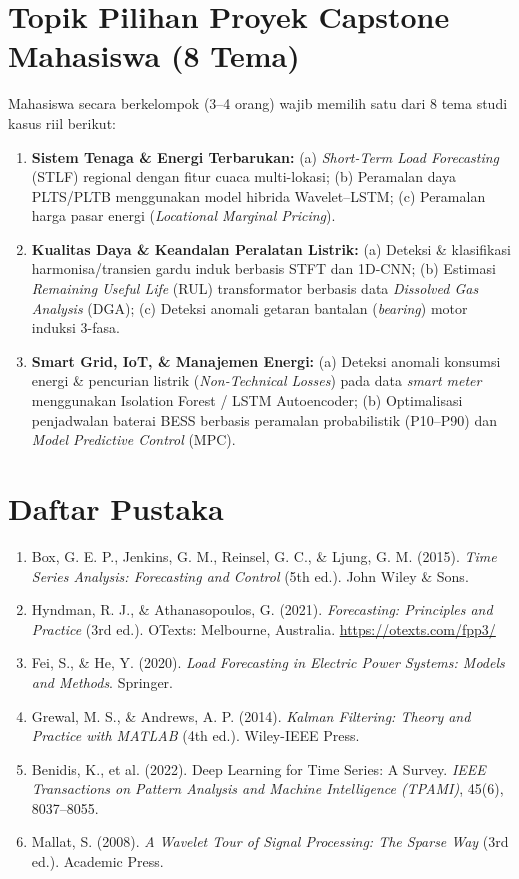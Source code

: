\documentclass[9.5pt,a4paper]{article}
\begin{document}
\section{Topik Pilihan Proyek Capstone Mahasiswa (8 Tema)}
Mahasiswa secara berkelompok (3--4 orang) wajib memilih satu dari 8 tema studi kasus riil berikut:
\begin{enumerate}
    \item \textbf{Sistem Tenaga \& Energi Terbarukan:} (a) \textit{Short-Term Load Forecasting} (STLF) regional dengan fitur cuaca multi-lokasi; (b) Peramalan daya PLTS/PLTB menggunakan model hibrida Wavelet--LSTM; (c) Peramalan harga pasar energi (\textit{Locational Marginal Pricing}).
    \item \textbf{Kualitas Daya \& Keandalan Peralatan Listrik:} (a) Deteksi \& klasifikasi harmonisa/transien gardu induk berbasis STFT dan 1D-CNN; (b) Estimasi \textit{Remaining Useful Life} (RUL) transformator berbasis data \textit{Dissolved Gas Analysis} (DGA); (c) Deteksi anomali getaran bantalan (\textit{bearing}) motor induksi 3-fasa.
    \item \textbf{Smart Grid, IoT, \& Manajemen Energi:} (a) Deteksi anomali konsumsi energi \& pencurian listrik (\textit{Non-Technical Losses}) pada data \textit{smart meter} menggunakan Isolation Forest / LSTM Autoencoder; (b) Optimalisasi penjadwalan baterai BESS berbasis peramalan probabilistik (P10--P90) dan \textit{Model Predictive Control} (MPC).
\end{enumerate}

\section{Daftar Pustaka}
\begin{enumerate}
    \item Box, G. E. P., Jenkins, G. M., Reinsel, G. C., \& Ljung, G. M. (2015). \textit{Time Series Analysis: Forecasting and Control} (5th ed.). John Wiley \& Sons.
    \item Hyndman, R. J., \& Athanasopoulos, G. (2021). \textit{Forecasting: Principles and Practice} (3rd ed.). OTexts: Melbourne, Australia. \url{https://otexts.com/fpp3/}
    \item Fei, S., \& He, Y. (2020). \textit{Load Forecasting in Electric Power Systems: Models and Methods}. Springer.
    \item Grewal, M. S., \& Andrews, A. P. (2014). \textit{Kalman Filtering: Theory and Practice with MATLAB} (4th ed.). Wiley-IEEE Press.
    \item Benidis, K., et al. (2022). Deep Learning for Time Series: A Survey. \textit{IEEE Transactions on Pattern Analysis and Machine Intelligence (TPAMI)}, 45(6), 8037--8055.
    \item Mallat, S. (2008). \textit{A Wavelet Tour of Signal Processing: The Sparse Way} (3rd ed.). Academic Press.
\end{enumerate}
\end{document}
